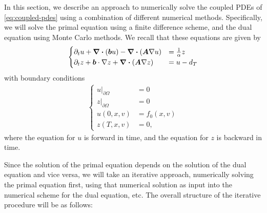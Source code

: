 In this section, we describe an approach to numerically solve the coupled PDEs of \autoref{eq:coupled-pdes} using a combination of different numerical methods. Specifically, we will solve the primal equation using a finite difference scheme, and the dual equation using Monte Carlo methods. We recall that these equations are given by 
%
\begin{align} 
    \begin{cases} 
        \partial_t u + \div{(\boldsymbol{b}u)} - \div{(\boldsymbol{A} \nabla u)} &= \frac{1}{\alpha} z\\
        \partial_t z + \boldsymbol{b} \cdot \nabla z + \div{(\boldsymbol{A} \nabla z)} &= u - d_T
    \end{cases}
\end{align}
%
with boundary conditions 
%
\begin{align}
    \begin{cases} 
        {u \rvert}_{\partial \Omega} &= 0\\
        {z \rvert}_{\partial \Omega} &= 0\\
        u(0,x,v) &= f_0(x,v)\\
        z(T,x,v) &= 0,
    \end{cases} 
\end{align}
%
where the equation for $u$ is forward in time, and the equation for $z$ is backward in time. 

Since the solution of the primal equation depends on the solution of the dual equation and vice versa, we will take an iterative approach, numerically solving the primal equation first, using that numerical solution as input into the numerical scheme for the dual equation, etc. The overall structure of the iterative procedure will be as follows:


